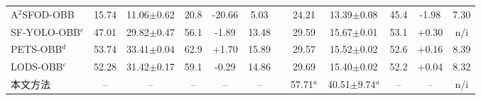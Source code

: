 \begin{table}[t]
\begin{tabular}{@{}l ccccc c ccccc@{}}
A$^2$SFOD-OBB & 15.74 & 11.06{\tiny$\pm$0.62} & 20.8 & -20.66 & 5.03 &  & 24.21 & 13.39{\tiny$\pm$0.08} & 45.4 & -1.98 & 7.30 \\
SF-YOLO-OBB$^{c}$ & 47.01 & 29.82{\tiny$\pm$0.47} & 56.1 & -1.89 & 13.48 &  & 29.59 & 15.67{\tiny$\pm$0.01} & 53.1 & +0.30 & n/i \\
PETS-OBB$^{d}$ & 53.74 & 33.41{\tiny$\pm$0.04} & 62.9 & +1.70 & 15.89 &  & 29.57 & 15.52{\tiny$\pm$0.02} & 52.6 & +0.16 & 8.39 \\
LODS-OBB$^{e}$ & 52.28 & 31.42{\tiny$\pm$0.17} & 59.1 & -0.29 & 14.86 &  & 29.69 & 15.40{\tiny$\pm$0.02} & 52.2 & +0.04 & 8.32 \\
\midrule
本文方法 & -- & -- & -- & -- & -- &  & 57.71$^{a}$ & 40.51{\tiny$\pm$9.74}$^{a}$ & -- & -- & n/i \\
\bottomrule
\end{tabular}
\par\smallskip
\begin{minipage}{\textwidth}\scriptsize

\end{minipage}
\end{table}
